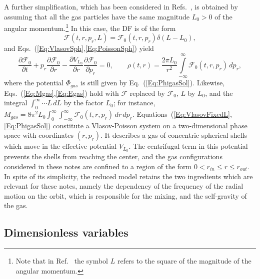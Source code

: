 A further simplification, which has been considered in Refs.~\cite{pDeJmAeMdN17,pRoS20,mHgRmScS25}, is obtained by assuming that all the gas particles have the same magnitude $L_0 > 0$ of the angular momentum.\footnote{Note that in Ref.~\cite{mHgRmScS25} the symbol $L$ refers to the square of the magnitude of the angular momentum.} In this case, the DF is of the form
\begin{equation}
\mathcal{F}(t,r,p_r,L) = \mathcal{F}_0(t,r,p_r)\delta(L - L_0),
\label{Eq:FixedL}
\end{equation}
and Eqs.~(\ref{Eq:VlasovSph},\ref{Eq:PoissonSph}) yield
\begin{equation}
\frac{\partial \mathcal{F}_0}{\partial t} + p_r\frac{\partial \mathcal{F}_0}{\partial r} - \frac{\partial V_{L_0}}{\partial r}\frac{\partial \mathcal{F}_0}{\partial p_r} = 0,\qquad
\rho(t,r) = \frac{2\pi L_0}{r^2}\int\limits_{-\infty}^\infty \mathcal{F}_0(t,r,p_r)\, dp_r,
\label{Eq:VlasovFixedL}
\end{equation}
where the potential $\Phi_{gas}$ is still given by Eq.~(\ref{Eq:PhigasSol}). Likewise, Eqs.~(\ref{Eq:Mgas},\ref{Eq:Egas}) hold with $\mathcal{F}$ replaced by $\mathcal{F}_0$, $L$ by $L_0$, and the integral $\int_0^\infty\cdots L\,dL$ by the factor $L_0$; for instance, $M_{gas} = 8\pi^2 L_0\int_0^\infty\int_{-\infty}^\infty \mathcal{F}_0(t,r,p_r)\, dr\, dp_r$. Equations~(\ref{Eq:VlasovFixedL},\ref{Eq:PhigasSol}) constitute a Vlasov-Poisson system on a two-dimensional phase space with coordinates $(r,p_r)$. It describes a gas of concentric spherical shells which move in the effective potential $V_{L_0}$. The centrifugal term in this potential prevents the shells from reaching the center, and the gas configurations considered in these notes are confined to a region of the form $0 < r_{in}\leq r\leq r_{out}$. In spite of its simplicity, the reduced model retains the two ingredients which are relevant for these notes, namely the dependency of the frequency of the radial motion on the orbit, which is responsible for the mixing, and the self-gravity of the gas.


\subsection{Dimensionless variables}
\label{SubSec:Units}

